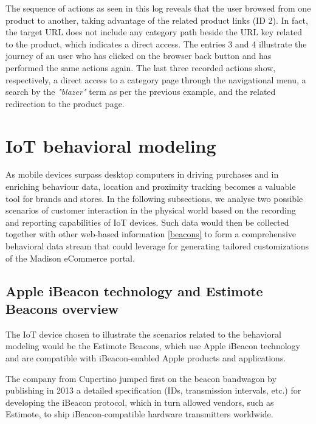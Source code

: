 The sequence of actions as seen in this log reveals that the user browsed from one product to another, taking advantage of the related product links (ID 2). In fact, the target URL does not include any category path beside the URL key related to the product, which indicates a direct access. The entries 3 and 4 illustrate the journey of an user who has clicked on the browser back button and has performed the same actions again. The last three recorded actions show, respectively, a direct access to a category page through the navigational menu, a search by the \textit{"blazer"} term as per the previous example, and the related redirection to the product page.

\newpage
\section{IoT behavioral modeling}

As mobile devices surpass desktop computers in driving purchases and in enriching behaviour data, location and proximity tracking becomes a valuable tool for brands and stores. In the following subsections, we analyse two possible scenarios of customer interaction in the physical world based on the recording and reporting capabilities of IoT devices. Such data would then be collected together with other web-based information \ref{beacons} to form a comprehensive behavioral data stream that could leverage for generating tailored customizations of the Madison eCommerce portal.

\subsection{Apple iBeacon technology and Estimote Beacons overview}

The IoT device chosen to illustrate the scenarios related to the behavioral modeling would be the Estimote Beacons, which use Apple iBeacon technology and are compatible with iBeacon-enabled Apple products and applications.

The company from Cupertino jumped first on the beacon bandwagon by publishing in 2013 a detailed specification (IDs, transmission intervals, etc.) for developing the iBeacon protocol, which in turn allowed vendors, such as Estimote, to ship iBeacon-compatible hardware transmitters worldwide.

